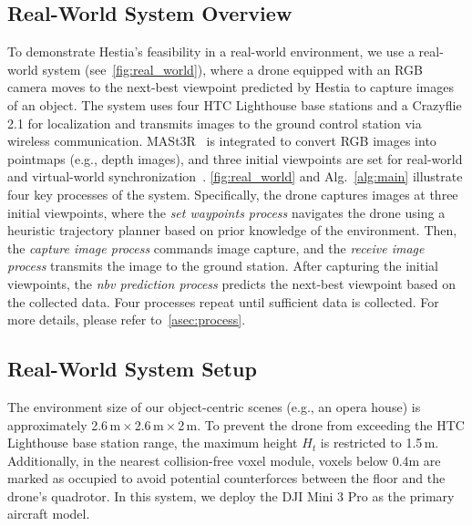 \subsection{Real-World System Overview}

To demonstrate Hestia's feasibility in a real-world environment, we use a real-world system (see~\cref{fig:real_world}), where a drone equipped with an RGB camera moves to the next-best viewpoint predicted by Hestia to capture images of an object. 
The system uses four HTC Lighthouse base stations and a Crazyflie 2.1 for localization and transmits images to the ground control station via wireless communication.
MASt3R~\cite{duisterhof2024mast3r} is integrated to convert RGB images into pointmaps (e.g., depth images), and three initial viewpoints are set for real-world and virtual-world synchronization~\cite{umeyama1991least}. 
\cref{fig:real_world} and Alg.~\ref{alg:main} illustrate four key processes of the system. 
Specifically, the drone captures images at three initial viewpoints, where the \textit{set waypoints process} navigates the drone using a heuristic trajectory planner based on prior knowledge of the environment. 
Then, the \textit{capture image process} commands image capture, and the \textit{receive image process} transmits the image to the ground station. 
After capturing the initial viewpoints, the \textit{nbv prediction process} predicts the next-best viewpoint based on the collected data.
Four processes repeat until sufficient data is collected. 
For more details, please refer to~\cref{asec:process}.

\subsection{Real-World System Setup}

The environment size of our object-centric scenes (e.g., an opera house) is approximately 2.6\,m\,$\times$\,2.6\,m\,$\times$\,2\,m.  
To prevent the drone from exceeding the HTC Lighthouse base station range, the maximum height $H_t$ is restricted to 1.5\,m.
Additionally, in the nearest collision-free voxel module, voxels below 0.4m are marked as occupied to avoid potential counterforces between the floor and the drone's quadrotor.
In this system, we deploy the DJI Mini 3 Pro as the primary aircraft model. 

